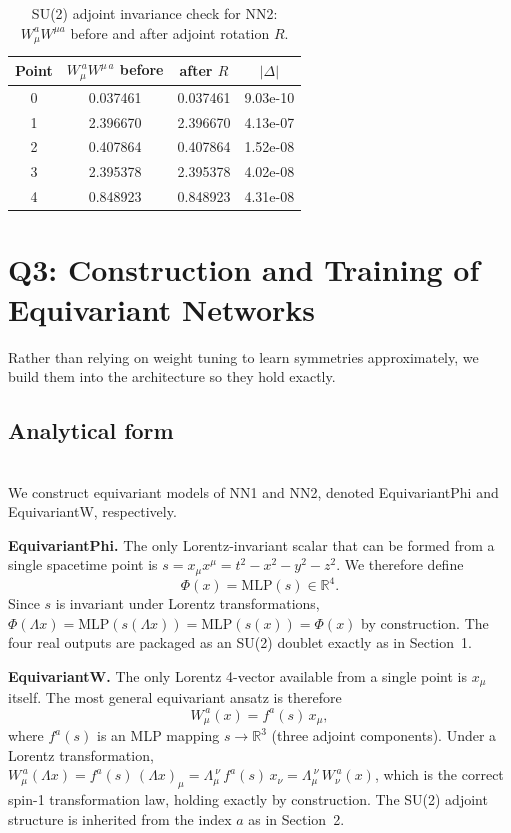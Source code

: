 \documentclass[10pt,leqno]{amsart}
\begin{document}
\begin{table}[H]
\centering
\caption{SU(2) adjoint invariance check for NN2: $W_\mu^a W^{\mu a}$ before and after adjoint rotation $R$.}
\label{tab:q2_su2}
\begin{tabular}{cccc}
Point & $W_\mu^{\,a}W^{\mu\,a}$ before & after $R$ & $|\Delta|$ \\
\hline
0 & 0.037461 & 0.037461 & 9.03e-10 \\
1 & 2.396670 & 2.396670 & 4.13e-07 \\
2 & 0.407864 & 0.407864 & 1.52e-08 \\
3 & 2.395378 & 2.395378 & 4.02e-08 \\
4 & 0.848923 & 0.848923 & 4.31e-08
\end{tabular}
\end{table}

\section{Q3: Construction and Training of Equivariant Networks}

Rather than relying on weight tuning to learn symmetries approximately,
we build them into the architecture so they hold exactly.

\subsection*{Analytical form}
\mbox{}\\
We construct equivariant models of NN1 and NN2, denoted
EquivariantPhi and EquivariantW, respectively.

\textbf{EquivariantPhi.}
The only Lorentz-invariant scalar that can be formed from a single
spacetime point is $s = x_\mu x^\mu = t^2 - x^2 - y^2 - z^2$. We
therefore define
\begin{equation}\label{eq:eq_phi}
\Phi(x) = \mathrm{MLP}(s) \in \mathbb{R}^4.
\end{equation}
Since $s$ is invariant under Lorentz transformations,
$\Phi(\Lambda x) = \mathrm{MLP}(s(\Lambda x)) = \mathrm{MLP}(s(x))
= \Phi(x)$ by construction. The four real outputs are packaged as an
SU(2) doublet exactly as in Section~1.

\textbf{EquivariantW.}
The only Lorentz 4-vector available from a single point is $x_\mu$ itself.
The most general equivariant ansatz is therefore
\begin{equation}\label{eq:eq_W}
W_\mu^{\,a}(x) = f^a(s)\,x_\mu,
\end{equation}
where $f^a(s)$ is an MLP mapping $s \to \mathbb{R}^3$ (three adjoint
components). Under a Lorentz transformation,
$W_\mu^{\,a}(\Lambda x) = f^a(s)\,(\Lambda x)_\mu
= \Lambda_\mu^{\ \nu}\,f^a(s)\,x_\nu
= \Lambda_\mu^{\ \nu}\,W_\nu^{\,a}(x)$,
which is the correct spin-1 transformation law, holding exactly by
construction. The SU(2) adjoint structure is inherited from the index $a$
as in Section~2.
\end{document}
